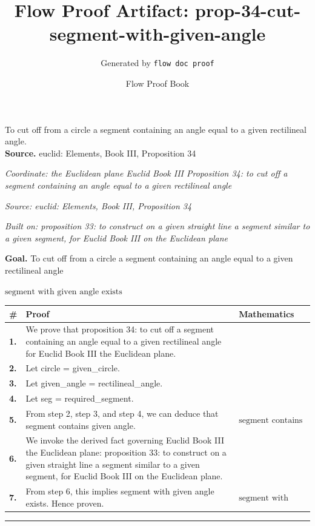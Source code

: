 \documentclass[11pt]{article}
\title{Flow Proof Artifact: prop-34-cut-segment-with-given-angle}
\author{Generated by \texttt{flow doc proof}}
\date{Flow Proof Book}
\theoremstyle{definition}
\begin{document}
\maketitle
To cut off from a circle a segment containing an angle equal to a given rectilineal angle.\\[0.5em]
\textbf{Source.} euclid: Elements, Book III, Proposition 34\\[0.5em]
\bigskip
{}\par
\smallskip\noindent\textit{Coordinate: the Euclidean plane \cdot Euclid Book III \cdot Proposition 34: to cut off a segment containing an angle equal to a given rectilineal angle}\par
\smallskip\noindent\textit{Source: euclid: Elements, Book III, Proposition 34}\par
\smallskip\noindent\textit{Built on: proposition 33: to construct on a given straight line a segment similar to a given segment, for Euclid Book III on the Euclidean plane}\par
\medskip
\noindent\textbf{Goal.} To cut off from a circle a segment containing an angle equal to a given rectilineal angle\par
\noindent$\displaystyle \text{segment with given angle exists}$\par
\medskip
\noindent
\begin{tabular}{@{} >{\raggedright\arraybackslash}p{} >{\raggedright\arraybackslash}p{} >{\raggedleft\arraybackslash}p{} @{}}
\textbf{\#} & \textbf{Proof} & \textbf{Mathematics} \\
\midrule
\textbf{1.} & We prove that proposition 34: to cut off a segment containing an angle equal to a given rectilineal angle for Euclid Book III the Euclidean plane. & \\[0.45em]
\textbf{2.} & Let circle = given\_circle. & \\[0.45em]
\textbf{3.} & Let given\_angle = rectilineal\_angle. & \\[0.45em]
\textbf{4.} & Let seg = required\_segment. & \\[0.45em]
\textbf{5.} & From step 2, step 3, and step 4, we can deduce that segment contains given angle. & $\displaystyle \text{segment contains given angle}$ \\[0.45em]
\textbf{6.} & We invoke the derived fact governing Euclid Book III the Euclidean plane: proposition 33: to construct on a given straight line a segment similar to a given segment, for Euclid Book III on the Euclidean plane. & \\[0.45em]
\textbf{7.} & From step 6, this implies segment with given angle exists. Hence proven. & $\displaystyle \text{segment with given angle exists}$ \\[0.45em]
\bottomrule
\end{tabular}
\label{thm:Geometry-Euclid Book III-proposition_34_to_cut_off_a_segment_containing_an_angle_equal_to_a_given_rectilineal_angle}
\par\medskip\hrule
\end{document}
